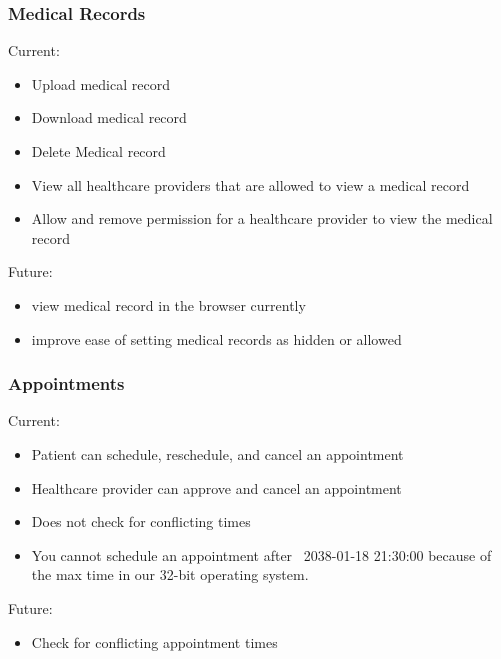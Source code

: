 \subsubsection{Medical Records}
Current: 
\begin{itemize}
\item Upload medical record
\item Download medical record
\item Delete Medical record
\item View all healthcare providers that are allowed to view a medical record
\item Allow and remove permission for a healthcare provider to view the medical record
\end{itemize}
Future:
\begin{itemize}
\item view medical record in the browser currently 
\item improve ease of setting medical records as hidden or allowed
\end{itemize}

\subsubsection{Appointments}
Current: 
\begin{itemize}
\item Patient can schedule, reschedule, and cancel an appointment
\item Healthcare provider can approve and cancel an appointment
\item Does not check for conflicting times 
\item You cannot schedule an appointment after ~2038-01-18 21:30:00 because of the max time in our 32-bit operating system. 
\end{itemize}
Future: 
\begin{itemize}
\item Check for conflicting appointment times
\end{itemize}

